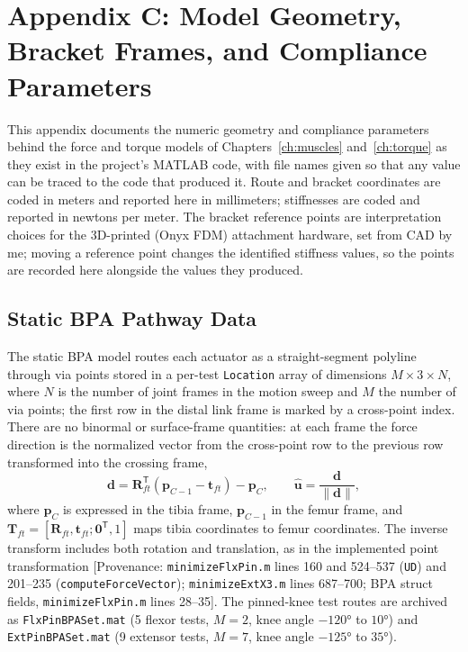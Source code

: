 \chapter{Appendix C: Model Geometry, Bracket Frames, and Compliance Parameters}\label{app:model_geometry}
\graphicspath{{../Figures/94-AppendixC/}{figs/94-AppendixC/}}

This appendix documents the numeric geometry and compliance parameters behind the force and torque models of Chapters~\ref{ch:muscles} and~\ref{ch:torque} as they exist in the project's MATLAB code, with file names given so that any value can be traced to the code that produced it. Route and bracket coordinates are coded in meters and reported here in millimeters; stiffnesses are coded and reported in newtons per meter. The bracket reference points are interpretation choices for the 3D-printed (Onyx FDM) attachment hardware, set from CAD by me; moving a reference point changes the identified stiffness values, so the points are recorded here alongside the values they produced.

\section{Static BPA Pathway Data}

The static BPA model routes each actuator as a straight-segment polyline through via points stored in a per-test \texttt{Location} array of dimensions $M\times3\times N$, where $N$ is the number of joint frames in the motion sweep and $M$ the number of via points; the first row in the distal link frame is marked by a cross-point index. There are no binormal or surface-frame quantities: at each frame the force direction is the normalized vector from the cross-point row to the previous row transformed into the crossing frame,
\begin{equation}
    \mathbf{d}=\mathbf{R}_{ft}^{\mathsf T}(\mathbf{p}_{C-1}-\mathbf{t}_{ft})-\mathbf{p}_{C},\qquad \hat{\mathbf{u}}=\frac{\mathbf{d}}{\lVert\mathbf{d}\rVert},
    \label{eq:app_forcedir}
\end{equation}
where $\mathbf{p}_{C}$ is expressed in the tibia frame, $\mathbf{p}_{C-1}$ in the femur frame, and $\mathbf{T}_{ft}=[\mathbf{R}_{ft},\mathbf{t}_{ft};\mathbf{0}^{\mathsf T},1]$ maps tibia coordinates to femur coordinates. The inverse transform includes both rotation and translation, as in the implemented point transformation [Provenance: \nolinkurl{minimizeFlxPin.m} lines 160 and 524--537 (\texttt{UD}) and 201--235 (\texttt{computeForceVector}); \nolinkurl{minimizeExtX3.m} lines 687--700; BPA struct fields, \nolinkurl{minimizeFlxPin.m} lines 28--35]. The pinned-knee test routes are archived as \nolinkurl{FlxPinBPASet.mat} (5 flexor tests, $M=2$, knee angle $\ang{-120}$ to $\ang{+10}$) and \nolinkurl{ExtPinBPASet.mat} (9 extensor tests, $M=7$, knee angle $\ang{-125}$ to $\ang{+35}$).


